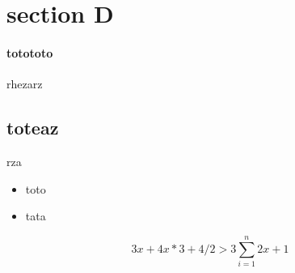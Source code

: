 \documentclass{article}
\begin{document}
\section{section D}{\paragraph{totototo}{rhezarz}\subsection{toteaz}{rza}}
\begin{itemize}
	 \item toto
	        \item tata
	        
	        
	        
	        
	        
	        
	        
	        
	        
	        
	        
	        
	        
	        
	        
	        
	        
\end{itemize}

\begin{equation}
3x+4x*3+4/2 > 3
{\sum_{i=1 }^{n} 2x+1}
\end{equation}
\end{document}
